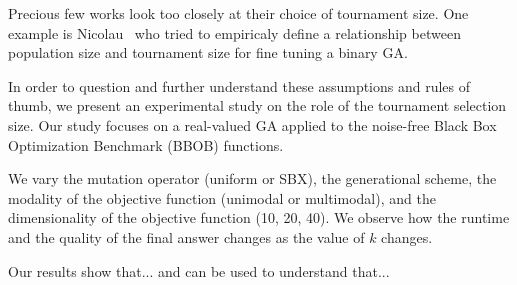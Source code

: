
Precious few works look too closely at their choice of tournament
size. One example is Nicolau~\cite{nicolau2009application} who tried
to empiricaly define a relationship between population size and
tournament size for fine tuning a binary GA.

In order to question and further understand these assumptions and
rules of thumb, we present an experimental study on the role of the
tournament selection size. Our study focuses on a real-valued GA
applied to the noise-free Black Box Optimization Benchmark (BBOB)
functions.

We vary the mutation operator (uniform or SBX), the generational
scheme, the modality of the objective function (unimodal or
multimodal), and the dimensionality of the objective function
(10, 20, 40).  We observe how the runtime and the quality of the final
answer changes as the value of $k$ changes.

Our results show that... and can be used to understand that...

 
 
